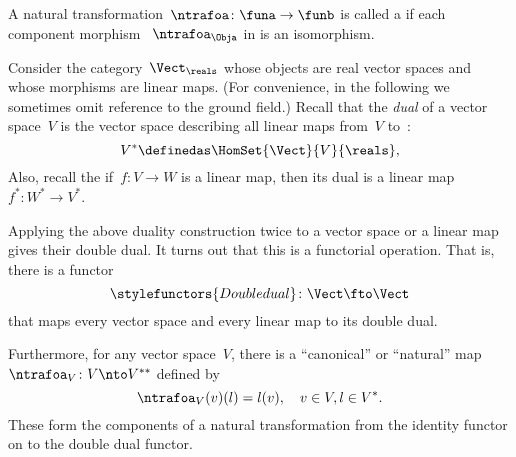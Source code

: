 \begin{figure}[h!]
  \begin{center}
  \end{center}
  \caption{
  \label{fig:nat_trans_graphically}}
\end{figure}

\begin{ctdefinition}
  \label{def:nat_iso}
  A natural transformation~$\ntrafoa \colon \funa \to \funb $ is called a \emph{} if each component morphism ~$\ntrafoa_\Obja$ in \CatD is an isomorphism.
\end{ctdefinition}

\begin{example}\label{ex:Vect}
  Consider the category~$\Vect_{\reals}$ whose objects are real vector spaces and whose morphisms are linear maps. (For convenience, in the following we sometimes omit reference to the ground field.) Recall that the \emph{dual} of a vector space~$V$ is the vector space describing all linear maps from~$V$ to~\reals:
  \begin{equation}\label{eq:dual-vector-space}
    V^* \definedas \HomSet{\Vect}{V}{\reals},
  \end{equation}
  Also, recall the if~$f\colon V \to W$ is a linear map, then its dual is a linear map~$f^*\colon W^* \to V^*$.

  Applying the above duality construction twice to a vector space or a linear map gives their double dual. It turns out that this is a functorial operation. That is, there is a functor~
  \begin{equation}\label{eq:double-dual-functor}
      \stylefunctors{Double dual}\colon \Vect \fto \Vect
  \end{equation}
  that maps every vector space and every linear map to its double dual.

  Furthermore, for any vector space~$V$, there is a ``canonical'' or ``natural'' map~$\ntrafoa_V \colon V \nto V^{**}$ defined by
  \begin{equation}\label{eq:natural-trafo-to-double-dual}
    \ntrafoa_V(v)(l) = l(v), \quad  v \in V, l \in V^*.
  \end{equation}
  These form the components of a natural transformation from the identity functor on \Vect to the double dual functor.
  \begin{center}
  \end{center}
\end{example}


\devel{

\begin{forslides}


\end{forslides}

}



